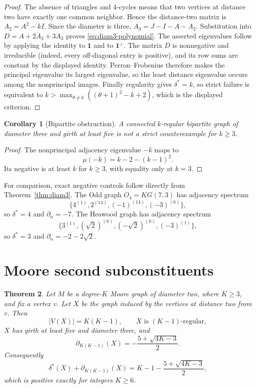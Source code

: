 \documentclass[a4paper,11pt,reqno]{amsart}
\theoremstyle{plain}
\newtheorem{theorem}{Theorem}[section]
\newtheorem{corollary}[theorem]{Corollary}
\theoremstyle{definition}
\theoremstyle{remark}
\newcommand{\one}{\mathbf 1}
\begin{document}
\begin{proof}
The absence of triangles and 4-cycles means that two vertices at distance two
have exactly one common neighbor.  Hence the distance-two matrix is
\(A_2=A^2-kI\).  Since the diameter is three,
\(A_3=J-I-A-A_2\).  Substitution into \(D=A+2A_2+3A_3\) proves
\eqref{eq:diam3-polynomial}.  The asserted eigenvalues follow by applying the
identity to \(\one\) and to \(\one^\perp\).  The matrix \(D\) is nonnegative
and irreducible (indeed, every off-diagonal entry is positive), and its row
sums are constant by the displayed identity.  Perron--Frobenius therefore
makes the principal eigenvalue its largest eigenvalue, so the least distance
eigenvalue occurs among the nonprincipal images.  Finally regularity gives
\(\delta^*=k\), so strict failure is equivalent to
\(k>\max_{\theta\ne k}((\theta+1)^2-k+2)\), which is the displayed
criterion.
\end{proof}

\begin{corollary}[Bipartite obstruction]
A connected \(k\)-regular bipartite graph of diameter three and girth at
least five is not a strict counterexample for \(k\ge3\).
\end{corollary}

\begin{proof}
The nonprincipal adjacency eigenvalue \(-k\) maps to
\[
 \mu(-k)=k-2-(k-1)^2.
\]
Its negative is at least \(k\) for \(k\ge3\), with equality only at \(k=3\).
\end{proof}

For comparison, exact negative controls follow directly from
Theorem~\ref{thm:diam3}.  The Odd graph \(O_4=KG(7,3)\) has adjacency
spectrum
\[
 \{4^{(1)},2^{(14)},(-1)^{(14)},(-3)^{(6)}\},
\]
so \(\delta^*=4\) and \(\partial_n=-7\).  The Heawood graph has adjacency
spectrum
\[
 \{3^{(1)},(\sqrt2)^{(6)},(-\sqrt2)^{(6)},(-3)^{(1)}\},
\]
so \(\delta^*=3\) and \(\partial_n=-2-2\sqrt2\).

\section{Moore second subconstituents}\label{sec:subconstituent}

\begin{theorem}\label{thm:second-sub}
Let \(M\) be a degree-\(K\) Moore graph of diameter two, where \(K\ge3\),
and fix a vertex \(v\).  Let \(X\) be the graph induced by the vertices at
distance two from \(v\).  Then
\[
 |V(X)|=K(K-1),\qquad X\text{ is }(K-1)\text{-regular},
\]
\(X\) has girth at least five and diameter three, and
\[
 \partial_{K(K-1)}(X)=-\frac{5+\sqrt{4K-3}}2.
\]
Consequently
\[
 \delta^*(X)+\partial_{K(K-1)}(X)
 =K-1-\frac{5+\sqrt{4K-3}}2,
\]
which is positive exactly for integers \(K\ge6\).
\end{theorem}
\end{document}
